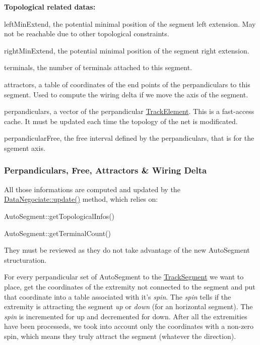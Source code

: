 {\bfseries Topological related datas\-:}
\begin{DoxyItemize}
\item {\ttfamily left\-Min\-Extend}, the potential minimal position of the segment left extension. May not be reachable due to other topological constraints.
\item {\ttfamily right\-Min\-Extend}, the potential minimal position of the segment right extension.
\item {\ttfamily terminals}, the number of terminals attached to this segment.
\item {\ttfamily attractors}, a table of coordinates of the end points of the perpandiculars to this segment. Used to compute the wiring delta if we move the axis of the segment.
\item {\ttfamily perpandiculars}, a {\ttfamily vector} of the perpandicular \hyperlink{classKite_1_1TrackElement}{Track\-Element}. This is a fast-\/access cache. It must be updated each time the topology of the net is modificated.
\item {\ttfamily perpandicular\-Free}, the free interval defined by the perpandiculars, that is for the sgement axis.
\end{DoxyItemize}\hypertarget{classKite_1_1DataNegociate_secAttractorsComputation}{}\subsubsection{Perpandiculars, Free, Attractors \& Wiring Delta}\label{classKite_1_1DataNegociate_secAttractorsComputation}
All those informations are computed and updated by the \hyperlink{classKite_1_1DataNegociate_ac5c54df7ed3b930268c8d7752c101725}{Data\-Negociate\-::update()} method, which relies on\-:
\begin{DoxyItemize}
\item Auto\-Segment\-::get\-Topological\-Infos()
\item Auto\-Segment\-::get\-Terminal\-Count()
\end{DoxyItemize}

They must be reviewed as they do not take advantage of the new Auto\-Segment structuration.

For every perpandicular set of Auto\-Segment to the \hyperlink{classKite_1_1TrackSegment}{Track\-Segment} we want to place, get the coordinates of the extremity not connected to the segment and put that coordinate into a table associated with it's {\itshape spin}. The {\itshape spin} tells if the extremity is attracting the segment {\itshape up} or {\itshape down} (for an horizontal segment). The {\itshape spin} is incremented for up and decremented for down. After all the extremities have been processeds, we took into account only the coordinates with a non-\/zero spin, which means they truly attract the segment (whatever the direction).


